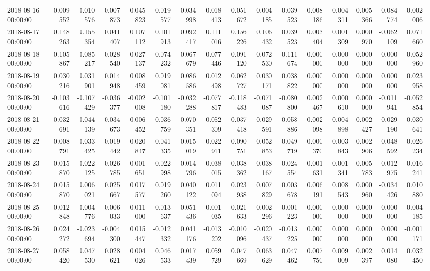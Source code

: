 \begin{tabular}{lrrrrrrrrrrrrrrr}
2018-08-16 00:00:00 & 0.009552 & 0.010576 & 0.007873 & -0.045823 & 0.019577 & 0.034998 & 0.018413 & -0.051672 & -0.004185 & 0.039523 & 0.008186 & 0.004311 & 0.005366 & -0.084774 & -0.002006 \\
2018-08-17 00:00:00 & 0.148263 & 0.155354 & 0.041407 & 0.107112 & 0.101913 & 0.092417 & 0.111016 & 0.156226 & 0.106432 & 0.039523 & 0.003404 & 0.001309 & 0.000970 & -0.062109 & 0.071660 \\
2018-08-18 00:00:00 & -0.105867 & -0.085217 & -0.028540 & -0.027137 & -0.074232 & -0.067679 & -0.077446 & -0.091120 & -0.072530 & -0.111674 & 0.000000 & 0.000000 & 0.000000 & 0.000000 & -0.052960 \\
2018-08-19 00:00:00 & 0.030216 & 0.031901 & 0.014948 & 0.008459 & 0.019081 & 0.086586 & 0.012498 & 0.062727 & 0.030171 & 0.038822 & 0.000000 & 0.000000 & 0.000000 & 0.000000 & 0.023958 \\
2018-08-20 00:00:00 & -0.103616 & -0.107429 & -0.036377 & -0.002008 & -0.101180 & -0.032288 & -0.077817 & -0.118483 & -0.071087 & -0.080800 & 0.002467 & 0.000610 & 0.000000 & -0.011941 & -0.052854 \\
2018-08-21 00:00:00 & 0.032691 & 0.044139 & 0.034673 & -0.006452 & 0.036759 & 0.070351 & 0.052309 & 0.037418 & 0.029591 & 0.058886 & 0.002098 & 0.004898 & 0.002427 & 0.029190 & 0.030641 \\
2018-08-22 00:00:00 & -0.008791 & -0.033425 & -0.019442 & -0.020847 & -0.041335 & 0.015019 & -0.022911 & -0.090751 & -0.052853 & -0.049719 & -0.000370 & 0.003843 & 0.002906 & -0.048592 & -0.026234 \\
2018-08-23 00:00:00 & -0.015870 & 0.022125 & 0.026785 & 0.001651 & 0.022998 & 0.014796 & 0.038015 & 0.038362 & 0.038167 & 0.024554 & -0.001631 & -0.001341 & 0.005783 & 0.012975 & 0.016241 \\
2018-08-24 00:00:00 & 0.015870 & 0.006021 & 0.025667 & 0.017577 & 0.019260 & 0.040122 & 0.011094 & 0.023938 & 0.007829 & 0.003678 & 0.006191 & 0.008543 & 0.000960 & -0.034426 & 0.010880 \\
2018-08-25 00:00:00 & -0.012848 & 0.004776 & 0.006033 & -0.011000 & -0.013637 & -0.051436 & -0.001035 & 0.021633 & -0.002296 & 0.001223 & 0.000000 & 0.000000 & 0.000000 & 0.000000 & -0.004185 \\
2018-08-26 00:00:00 & 0.024272 & -0.023694 & -0.004300 & 0.015447 & -0.012332 & 0.041176 & -0.013202 & -0.010096 & -0.020437 & -0.013225 & 0.000000 & 0.000000 & 0.000000 & 0.000000 & -0.001171 \\
2018-08-27 00:00:00 & 0.058420 & 0.047530 & 0.028621 & 0.004026 & 0.046533 & 0.017439 & 0.059729 & 0.047669 & 0.063629 & 0.047462 & 0.007750 & 0.009009 & 0.002397 & 0.014080 & 0.032450 \\

\end{tabular}
